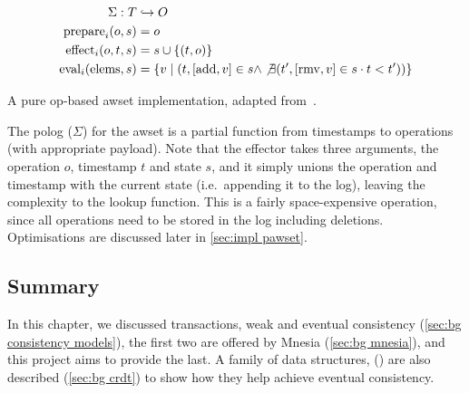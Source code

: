 \begin{listing}[htp]
  \begin{align*}
    \Sigma: T&\hookrightarrow O \\
    \mathrm{prepare}_i(o, s) &= o \\
    \mathrm{effect}_i(o, t, s) &= s \cup \{(t, o)\} \\
    \mathrm{eval}_i(\mathrm{elems}, s) &= \{v \mid (t, [\mathrm{add}, v]\in s \land 
    \not\exists (t', [\mathrm{rmv}, v]\in s\cdot t < t'))\}
  \end{align*}
  \caption{A pure op-based \acrshort{awset} implementation, adapted 
  from~\cite{baquero2017PureOp}.}
  \label{lst:pure op-based awset}
\end{listing}


The \acrshort{polog} (\(\Sigma\)) for the \acrshort{awset} is a partial function from 
timestamps to operations (with appropriate payload).
Note that the effector takes three arguments,
the operation \(o\), timestamp \(t\) and state \(s\), and it simply unions
the operation and timestamp with the current state (i.e.\ appending it to the log), 
leaving the complexity
to the lookup function. This is a fairly space-expensive operation, since all operations
need to be stored in the log including deletions. Optimisations are discussed
later in \cref{sec:impl pawset}.


\subsection{Summary}

In this chapter, we discussed transactions, weak and eventual 
consistency (\cref{sec:bg consistency models}), the first two are offered by Mnesia
(\cref{sec:bg mnesia}), and this project aims to provide the last.
A family of data structures, () are also described (\cref{sec:bg crdt})
to show how they help achieve eventual consistency.
